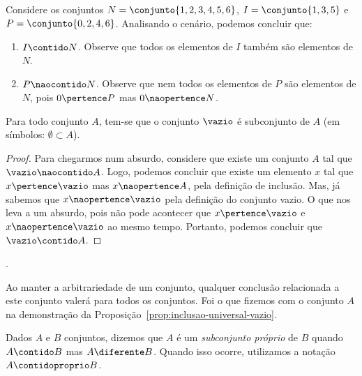 \begin{example}
	Considere os conjuntos $N = \conjunto{1, 2, 3, 4, 5, 6}$, $I = \conjunto{1, 3, 5}$ e $P = \conjunto{0, 2, 4, 6}$. Analisando o cenário, podemos concluir que:
	\begin{enumerate}
		\item $I \contido N$. Observe que todos os elementos de $I$ também são elementos de $N$.
		\item $P \naocontido N$. Observe que nem todos os elementos de $P$ são elementos de $N$, pois $0 \pertence P$ mas $0 \naopertence N$.
	\end{enumerate}
\end{example}

\begin{proposition}
	\label{prop:inclusao-universal-vazio}
	Para todo conjunto $A$, tem-se que o conjunto $\vazio$ é subconjunto de $A$ (em símbolos: $\emptyset \subset A$).
\end{proposition}

\begin{proof}
	Para chegarmos num absurdo, considere que existe um conjunto $A$ tal que $\vazio \naocontido A$. Logo, podemos concluir que existe um elemento $x$ tal que $x \pertence \vazio$ mas $x \naopertence A$, pela definição de inclusão. Mas, já sabemos que $x \naopertence \vazio$ pela definição do conjunto vazio. O que nos leva a um absurdo, pois não pode acontecer que $x \pertence \vazio$ e $x \naopertence \vazio$ ao mesmo tempo. Portanto, podemos concluir que $\vazio \contido A$.
\end{proof}


\begin{tve}
	.	
\end{tve}


\begin{remark}
	Ao manter a arbitrariedade de um conjunto, qualquer conclusão relacionada a este conjunto valerá para todos os conjuntos. Foi o que fizemos com o conjunto $A$ na demonstração da Proposição~\ref{prop:inclusao-universal-vazio}.
\end{remark}

\begin{definition}
	Dados $A$ e $B$ conjuntos, dizemos que $A$ é um \emph{subconjunto próprio} de $B$ quando $A \contido B$ mas $A \diferente B$. Quando isso ocorre, utilizamos a notação $A \contidoproprio B$.
\end{definition}

